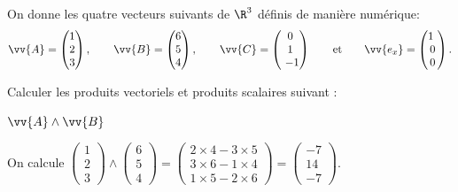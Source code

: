On donne les quatre vecteurs suivants de $\R^3$ définis de manière numérique:
\[
\vv{A} = \begin{pmatrix}
1	\\ 2 \\ 3
\end{pmatrix},
\qquad
\vv{B} = \begin{pmatrix}
6 \\ 5 \\ 4
\end{pmatrix},
\qquad
\vv{C} = \begin{pmatrix}
0 \\ 1 \\ -1
\end{pmatrix}\qquad\text{et}\qquad
\vv{e_x} = \begin{pmatrix}
1 \\ 0 \\ 0
\end{pmatrix}.
\]

Calculer les produits vectoriels et produits scalaires suivant : 

\debutEntrainement


\begin{enonce}
$\vv{A}\wedge\vv{B}$
\end{enonce}


\begin{corrige}
	On calcule $
	\begin{pmatrix}
		1	\\ 2 \\ 3
	\end{pmatrix} \wedge
	\begin{pmatrix}
		6 \\ 5 \\ 4
	\end{pmatrix}
	=
	\begin{pmatrix}
		2\times4 - 3\times 5 \\
		3\times6 - 1\times4	\\
		1\times5 - 2\times6
	\end{pmatrix}
	=
	\begin{pmatrix}
		-7 \\ 14 \\ -7
	\end{pmatrix}
	$.
\end{corrige}

